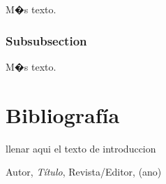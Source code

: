 \documentclass{article}
\theoremstyle{definition}
\theoremstyle{remark}
\begin{document}
M�s texto.

\subsubsection{Subsubsection}\label{sec:nada2}

M�s texto.





\section{Bibliograf\'ia}

llenar aqui el texto de introduccion








\begin{thebibliography}{99}

 Autor, \emph{T\'itulo}, Revista/Editor, (ano)

\end{thebibliography}
\end{document}
